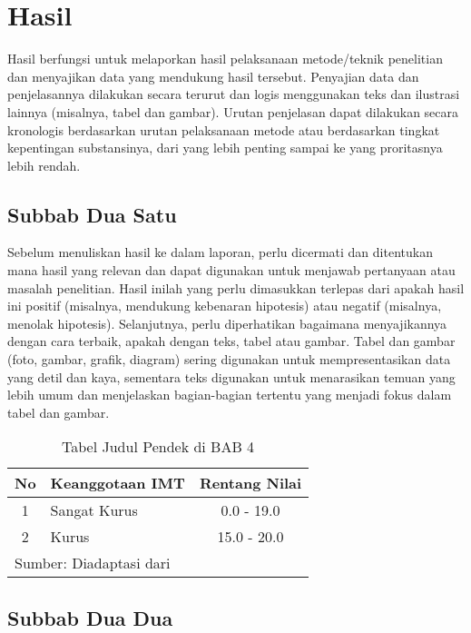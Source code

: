 
\newpage
\chapter{Hasil}
 
Hasil berfungsi untuk melaporkan hasil pelaksanaan metode/teknik penelitian dan menyajikan data yang mendukung hasil tersebut. Penyajian data dan penjelasannya dilakukan secara terurut dan logis menggunakan teks dan ilustrasi lainnya (misalnya, tabel dan gambar). Urutan penjelasan dapat dilakukan secara kronologis berdasarkan urutan pelaksanaan metode atau berdasarkan tingkat kepentingan substansinya, dari yang lebih penting sampai ke yang proritasnya lebih rendah. 

\section{Subbab Dua Satu}

Sebelum menuliskan hasil ke dalam laporan, perlu dicermati dan ditentukan mana hasil yang relevan dan dapat digunakan untuk menjawab pertanyaan atau masalah penelitian.  Hasil inilah yang perlu dimasukkan terlepas dari apakah hasil ini positif (misalnya, mendukung kebenaran hipotesis) atau negatif (misalnya, menolak hipotesis). Selanjutnya, perlu diperhatikan bagaimana menyajikannya dengan cara terbaik, apakah dengan teks, tabel atau gambar. Tabel dan gambar (foto, gambar, grafik, diagram) sering digunakan untuk mempresentasikan data yang detil dan kaya, sementara teks digunakan untuk menarasikan temuan yang lebih umum dan menjelaskan bagian-bagian tertentu yang menjadi fokus dalam tabel dan gambar. 

\begin{table}
  \centering
  \renewcommand{\arraystretch}{1.2}
  \caption{Tabel Judul Pendek di BAB 4}
  \begin{tabular}{clc}
    \hline
    No & Keanggotaan IMT & Rentang Nilai \\
    \hline
    1 & Sangat Kurus & 0.0 - 19.0 \\
    2 & Kurus & 15.0 - 20.0 \\
    \hline
    \multicolumn{3}{l}{\footnotesize{Sumber: Diadaptasi dari \cite{anggariawan:2014}}} \\
  \end{tabular}
  \label{tab:dibab4}
\end{table}


\section{Subbab Dua Dua}

